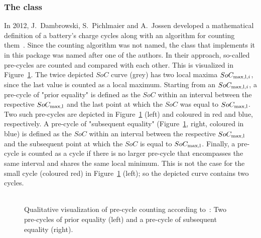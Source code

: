 \subsubsection{The  class}
In 2012, J.~Dambrowski, S.~Pichlmaier and A.~Jossen developed a mathematical definition of a battery's charge cycles along with an algorithm for counting them~\cite{dambrowski_mathematical_2012}. Since the counting algorithm was not named, the  class that implements it in this package was named after one of the authors. In their approach, so-called pre-cycles are counted and compared with each other. This is visualized in Figure~\ref{fig:pre_cycles}. The twice depicted $SoC$ curve (grey) has two local maxima $SoC_{\text{max,l}, i}$, since the last value is counted as a local maximum. Starting from an $SoC_{\text{max,l}, i}$, a pre-cycle of "prior equality" is defined as the $SoC$ within an interval between the respective  $SoC_\text{max,l}$ and the last point at which the $SoC$ was equal to  $SoC_\text{max,l}$. Two such pre-cycles are depicted in Figure~\ref{fig:pre_cycles} (left) and coloured in red and blue, respectively. A pre-cycle of "subsequent equality" (Figure~\ref{fig:pre_cycles}, right, coloured in blue) is defined as the $SoC$ within an interval between the respective $SoC_\text{max,l}$ and the subsequent point at which the $SoC$ is equal to $SoC_\text{max,l}$. Finally, a pre-cycle is counted as a cycle if there is no larger pre-cycle that encompasses the same interval and shares the same local minimum. This is not the case for the small cycle (coloured red) in Figure~\ref{fig:pre_cycles} (left); so the depicted curve contains two cycles. \\ \\
\begin{centering}
	\begin{figure}[t!]
		\captionsetup{type = figure}
		\caption[Qualitative visualization of pre-cycle counting: Two pre-cycles of prior equality and a pre-cycle of subsequent equality]{Qualitative visualization of pre-cycle counting according to~\cite{dambrowski_mathematical_2012}: Two pre-cycles of prior equality (left) and a pre-cycle of subsequent equality (right).}
		\label{fig:pre_cycles} 
	\end{figure}
\end{centering}
